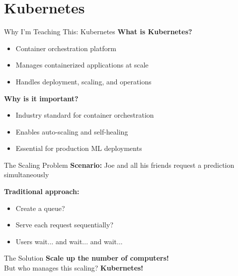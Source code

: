 \documentclass[../main.tex]{subfiles}
\begin{document}
\section{Kubernetes}

\begin{frame}{Why I'm Teaching This: Kubernetes}
    \textbf{What is Kubernetes?}
    \begin{itemize}
        \item Container orchestration platform
        \item Manages containerized applications at scale
        \item Handles deployment, scaling, and operations
    \end{itemize}

    \bigskip

    \textbf{Why is it important?}
    \begin{itemize}
        \item Industry standard for container orchestration
        \item Enables auto-scaling and self-healing
        \item Essential for production ML deployments
    \end{itemize}
\end{frame}

\begin{frame}{The Scaling Problem}
    \textbf{Scenario:} Joe and all his friends request a prediction simultaneously

    \bigskip

    \textbf{Traditional approach:}
    \begin{itemize}
        \item Create a queue?
        \item Serve each request sequentially?
        \item Users wait... and wait... and wait...
    \end{itemize}

    \bigskip

    \begin{alertblock}{The Solution}
        \textbf{Scale up the number of computers!} \\
        But who manages this scaling? \textbf{Kubernetes!}
    \end{alertblock}
\end{frame}
\end{document}
